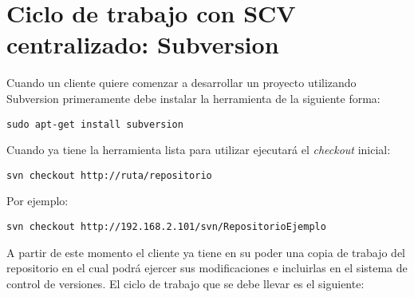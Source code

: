 \section{Ciclo de trabajo con \textbf{SCV} centralizado: Subversion}

Cuando un cliente quiere comenzar a desarrollar un proyecto utilizando
Subversion primeramente debe instalar la herramienta de la siguiente
forma: 
\begin{lstlisting}[style=consola]
sudo apt-get install subversion
\end{lstlisting}

Cuando ya tiene la herramienta lista para utilizar ejecutará el
\textit{checkout} inicial:  
\begin{lstlisting}[style=consola]
svn checkout http://ruta/repositorio 
\end{lstlisting}
Por ejemplo: 
\begin{lstlisting}[style=consola]
svn checkout http://192.168.2.101/svn/RepositorioEjemplo 
\end{lstlisting}

A partir de este momento el cliente ya tiene en su poder una copia de
trabajo del repositorio en el cual podrá ejercer sus modificaciones e
incluirlas en el sistema de control de versiones. El ciclo de trabajo
que se debe llevar es el siguiente: 

